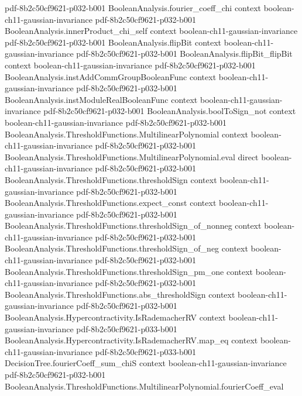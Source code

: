 \begin{theorem}
  {pdf-8b2c50cf9621-p032-b001}
\proofstep
  {BooleanAnalysis.fourier_coeff_chi}
  {context}
  {boolean-ch11-gaussian-invariance}
  {pdf-8b2c50cf9621-p032-b001}
\proofstep
  {BooleanAnalysis.innerProduct_chi_self}
  {context}
  {boolean-ch11-gaussian-invariance}
  {pdf-8b2c50cf9621-p032-b001}
\proofstep
  {BooleanAnalysis.flipBit}
  {context}
  {boolean-ch11-gaussian-invariance}
  {pdf-8b2c50cf9621-p032-b001}
\proofstep
  {BooleanAnalysis.flipBit_flipBit}
  {context}
  {boolean-ch11-gaussian-invariance}
  {pdf-8b2c50cf9621-p032-b001}
\proofstep
  {BooleanAnalysis.instAddCommGroupBooleanFunc}
  {context}
  {boolean-ch11-gaussian-invariance}
  {pdf-8b2c50cf9621-p032-b001}
\proofstep
  {BooleanAnalysis.instModuleRealBooleanFunc}
  {context}
  {boolean-ch11-gaussian-invariance}
  {pdf-8b2c50cf9621-p032-b001}
\proofstep
  {BooleanAnalysis.boolToSign_not}
  {context}
  {boolean-ch11-gaussian-invariance}
  {pdf-8b2c50cf9621-p032-b001}
\proofstep
  {BooleanAnalysis.ThresholdFunctions.MultilinearPolynomial}
  {context}
  {boolean-ch11-gaussian-invariance}
  {pdf-8b2c50cf9621-p032-b001}
\proofstep
  {BooleanAnalysis.ThresholdFunctions.MultilinearPolynomial.eval}
  {direct}
  {boolean-ch11-gaussian-invariance}
  {pdf-8b2c50cf9621-p032-b001}
\proofstep
  {BooleanAnalysis.ThresholdFunctions.thresholdSign}
  {context}
  {boolean-ch11-gaussian-invariance}
  {pdf-8b2c50cf9621-p032-b001}
\proofstep
  {BooleanAnalysis.ThresholdFunctions.expect_const}
  {context}
  {boolean-ch11-gaussian-invariance}
  {pdf-8b2c50cf9621-p032-b001}
\proofstep
  {BooleanAnalysis.ThresholdFunctions.thresholdSign_of_nonneg}
  {context}
  {boolean-ch11-gaussian-invariance}
  {pdf-8b2c50cf9621-p032-b001}
\proofstep
  {BooleanAnalysis.ThresholdFunctions.thresholdSign_of_neg}
  {context}
  {boolean-ch11-gaussian-invariance}
  {pdf-8b2c50cf9621-p032-b001}
\proofstep
  {BooleanAnalysis.ThresholdFunctions.thresholdSign_pm_one}
  {context}
  {boolean-ch11-gaussian-invariance}
  {pdf-8b2c50cf9621-p032-b001}
\proofstep
  {BooleanAnalysis.ThresholdFunctions.abs_thresholdSign}
  {context}
  {boolean-ch11-gaussian-invariance}
  {pdf-8b2c50cf9621-p032-b001}
\proofstep
  {BooleanAnalysis.Hypercontractivity.IsRademacherRV}
  {context}
  {boolean-ch11-gaussian-invariance}
  {pdf-8b2c50cf9621-p033-b001}
\proofstep
  {BooleanAnalysis.Hypercontractivity.IsRademacherRV.map_eq}
  {context}
  {boolean-ch11-gaussian-invariance}
  {pdf-8b2c50cf9621-p033-b001}
\proofstep
  {DecisionTree.fourierCoeff_sum_chiS}
  {context}
  {boolean-ch11-gaussian-invariance}
  {pdf-8b2c50cf9621-p032-b001}
\proofstep
  {BooleanAnalysis.ThresholdFunctions.MultilinearPolynomial.fourierCoeff_eval}

\end{theorem}
